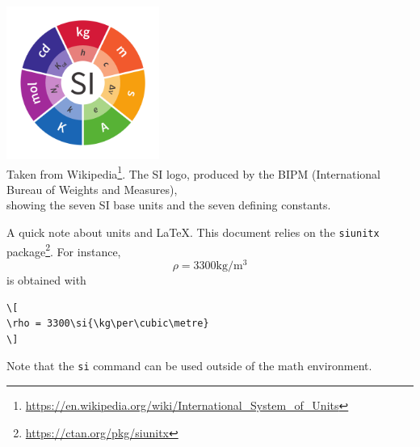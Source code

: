\begin{center}
\includegraphics[width=5cm]{images/siunits}\\
{\captionfont Taken from 
Wikipedia\footnote{\url{https://en.wikipedia.org/wiki/International_System_of_Units}}.
The SI logo, produced by the BIPM (International Bureau of Weights and Measures), \\
showing the seven SI base units and the seven defining constants.}
\end{center}

A quick note about units and \LaTeX. This document relies on the {\tt siunitx} 
package\footnote{\url{https://ctan.org/pkg/siunitx}}. For instance, 
\[
\rho = 3300\si{\kg\per\cubic\metre}
\]
is obtained with 
\begin{verbatim}
\[
\rho = 3300\si{\kg\per\cubic\metre}
\]
\end{verbatim}
Note that the {\tt si} command can be used outside of the math environment. 
